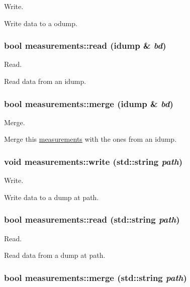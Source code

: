 Write. 

Write data to a odump. \hypertarget{classmeasurements_16b99ed7218f85ecf1494519d155d9ab}{
\subsubsection[read]{\setlength{\rightskip}{0pt plus 5cm}bool measurements::read (idump \& {\em bd})}}
\label{classmeasurements_16b99ed7218f85ecf1494519d155d9ab}


Read. 

Read data from an idump. \hypertarget{classmeasurements_5a0d8032fe5c156ed577b637e4cde3c3}{
\subsubsection[merge]{\setlength{\rightskip}{0pt plus 5cm}bool measurements::merge (idump \& {\em bd})}}
\label{classmeasurements_5a0d8032fe5c156ed577b637e4cde3c3}


Merge. 

Merge this \hyperlink{classmeasurements}{measurements} with the ones from an idump. \hypertarget{classmeasurements_396460ca67c99ae0fc99c5a5fe52e472}{
\subsubsection[write]{\setlength{\rightskip}{0pt plus 5cm}void measurements::write (std::string {\em path})}}
\label{classmeasurements_396460ca67c99ae0fc99c5a5fe52e472}


Write. 

Write data to a dump at path. \hypertarget{classmeasurements_56f0c9b4ebd6f87795402c24011f1388}{
\subsubsection[read]{\setlength{\rightskip}{0pt plus 5cm}bool measurements::read (std::string {\em path})}}
\label{classmeasurements_56f0c9b4ebd6f87795402c24011f1388}


Read. 

Read data from a dump at path. \hypertarget{classmeasurements_ecbd633babf361d23fc1119bcb786b63}{
\subsubsection[merge]{\setlength{\rightskip}{0pt plus 5cm}bool measurements::merge (std::string {\em path})}}
\label{classmeasurements_ecbd633babf361d23fc1119bcb786b63}


